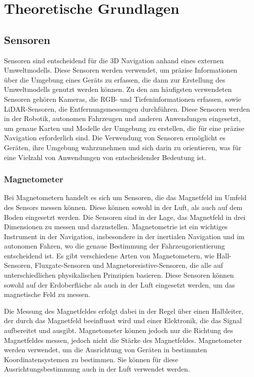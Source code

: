 \chapter{Theoretische Grundlagen}

\section{Sensoren} \label{sensoren:section}

Sensoren sind entscheidend für die 3D Navigation anhand eines externen Umweltmodells. Diese Sensoren werden verwendet, um präzise Informationen über die Umgebung eines Geräts zu erfassen, die dann zur Erstellung des Umweltmodells genutzt werden können. Zu den am häufigsten verwendeten Sensoren gehören Kameras, die RGB- und Tiefeninformationen erfassen, sowie LiDAR-Sensoren, die Entfernungsmessungen durchführen. Diese Sensoren werden in der Robotik, autonomen Fahrzeugen und anderen Anwendungen eingesetzt, um genaue Karten und Modelle der Umgebung zu erstellen, die für eine präzise Navigation erforderlich sind. Die Verwendung von Sensoren ermöglicht es Geräten, ihre Umgebung wahrzunehmen und sich darin zu orientieren, was für eine Vielzahl von Anwendungen von entscheidender Bedeutung ist.

    \subsection{Magnetometer} \label{magnetometer:subsection}

    Bei Magnetometern handelt es sich um Sensoren, die das Magnetfeld im Umfeld des Sensors messen können.
    Diese können sowohl in der Luft, als auch auf dem Boden eingesetzt werden.
    Die Sensoren sind in der Lage, das Magnetfeld in drei Dimensionen zu messen und darzustellen.
    Magnetometrie ist ein wichtiges Instrument in der Navigation, insbesondere in der inertialen Navigation und im autonomen Fahren, wo die genaue Bestimmung der Fahrzeugorientierung entscheidend ist. Es gibt verschiedene Arten von Magnetometern, wie Hall-Sensoren, Fluxgate-Sensoren und Magnetoresistive-Sensoren, die alle auf unterschiedlichen physikalischen Prinzipien basieren. Diese Sensoren können sowohl auf der Erdoberfläche als auch in der Luft eingesetzt werden, um das magnetische Feld zu messen.

    Die Messung des Magnetfeldes erfolgt dabei in der Regel über einen Halbleiter, der durch das Magnetfeld beeinflusst wird und einer Elektronik, die das Signal aufbereitet und ausgibt.
    Magnetometer können jedoch nur die Richtung des Magnetfeldes messen, jedoch nicht die Stärke des Magnetfeldes.
    Magnetometer werden verwendet, um die Ausrichtung von Geräten in bestimmten Koordinatensystemen zu bestimmen.
    Sie können für diese Ausrichtungsbestimmung auch in der Luft verwendet werden. 
 

